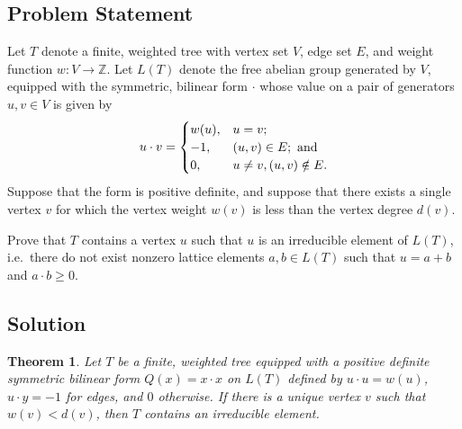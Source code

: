 \documentclass[12pt]{article}
\newcommand{\bZ}{\mathbb{Z}}
\newtheorem{theorem}{Theorem}
\begin{document}
\date{}


\subsection*{Problem Statement}

Let $T$ denote a finite, weighted tree with vertex set $V$, edge set $E$, and weight function $w : V \longrightarrow \bZ$.
Let $L(T)$ denote the free abelian group generated by $V$, equipped with the symmetric, bilinear form $\cdot$ whose value on a pair of generators $u,v \in V$ is given by 
\[
u \cdot v = 
\begin{cases}
    w(u), & u=v; \\
    -1, & (u,v) \in E; \textup{ and} \\
    0, & u \ne v, (u,v) \notin E.
\end{cases}
\]
Suppose that the form is positive definite, and suppose that there exists a single vertex $v$ for which the vertex weight $w(v)$ is less than the vertex degree $d(v)$.

Prove that $T$ contains a vertex $u$ such that $u$ is an irreducible element of $L(T)$, i.e.~there do not exist nonzero lattice elements $a,b \in L(T)$ such that $u = a+b$ and $a \cdot b \ge 0$.

\subsection*{Solution}

\begin{theorem}
Let $T$ be a finite, weighted tree equipped with a positive definite symmetric bilinear form $Q(x) = x \cdot x$ on $L(T)$ defined by $u \cdot u = w(u)$, $u \cdot y = -1$ for edges, and $0$ otherwise. If there is a unique vertex $v$ such that $w(v) < d(v)$, then $T$ contains an irreducible element.
\end{theorem}
\end{document}
